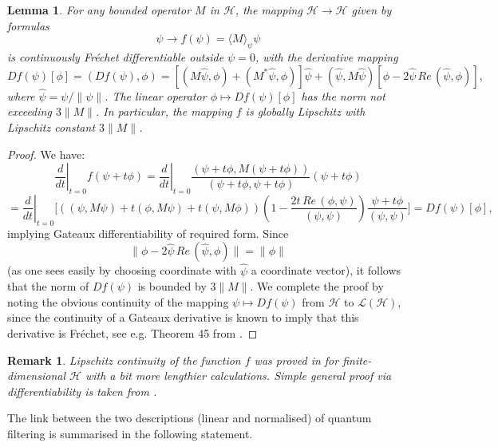 \documentclass[10pt,a4paper]{amsart}
\def\LC{\mathcal{L}}
\def\HC{\mathcal{H}}
\newtheorem{lemma}{Lemma}[section]
\newtheorem{remark}{Remark}
\begin{document}
\begin{lemma}
 \label{lemboundder}
 For any bounded operator $M$ in $\HC$, the mapping
 $\HC \to \HC$ given by formulas
 \[
 \psi \to f(\psi)= \langle M \rangle_{\psi} \psi
\]
is continuously Fr\'echet differentiable outside  $\psi= 0$, with the derivative mapping
\[
Df(\psi)[\phi]=(Df(\psi),\phi)
=[(M\hat \psi, \phi)+(M^*\hat \psi, \phi)] \hat \psi
 +(\hat \psi, M\hat \psi)\left[\phi-2\hat \psi \,Re\, (\hat \psi, \phi)\right],
 \]
 where $\hat \psi=\psi/\|\psi\|$. The linear operator $\phi\mapsto Df(\psi)[\phi]$
has the norm not exceeding $3\|M\|$.
In particular, the mapping $f$ is globally Lipschitz with Lipschitz constant $3\|M\|$.
\end{lemma}

\begin{proof}
We have:
\[
\left.\frac{d}{dt}\right|_{t=0} f(\psi+t\phi)
=\left.\frac{d}{dt}\right|_{t=0} \frac{(\psi+t\phi, M(\psi+t\phi))}{(\psi+t\phi, \psi+t\phi)} (\psi+t\phi)
\]
\[
=\left.\frac{d}{dt}\right|_{t=0}\bigl[((\psi,M\psi)+t(\phi, M\psi) +t(\psi, M\phi))
\left(1-\frac{2t \, Re\, (\phi,\psi)}{(\psi,\psi)}\right)\frac{\psi+t\phi}{(\psi,\psi)}\bigr]
=Df(\psi)[\phi],
\]
implying Gateaux differentiability of required form. Since
\[
\|\phi-2\hat \psi \,Re\, (\hat \psi, \phi)\|=\|\phi\|
 \]
(as one sees easily by choosing coordinate  with $\hat \psi$ a coordinate vector),
it follows that the norm of $Df(\psi)$ is bounded by $3\|M\|$. We complete the proof by noting
the obvious continuity of the mapping  $\psi\mapsto Df(\psi)$ from $\HC$ to $\LC(\HC)$,
since the continuity of a Gateaux derivative is known to imply that this derivative is Fr\'echet,
see e.g. Theorem 45 from \cite{Toolbox}.
\end{proof}

\begin{remark} Lipschitz continuity of the function $f$ was proved in \cite{BarchBook}
 for finite-dimensional $\HC$ with a bit more lengthier
calculations. Simple general proof via differentiability is taken from \cite{Kol25a}.
\end{remark}

The link between the two descriptions (linear and normalised) of quantum filtering
is summarised in the following statement.
\end{document}
